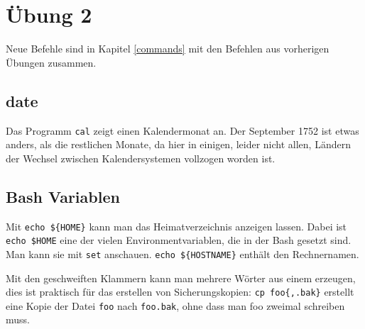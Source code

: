 \documentclass[12pt]{article}
\begin{document}
\section{Übung 2}

Neue Befehle sind in Kapitel \ref{commands} mit den Befehlen aus vorherigen Übungen zusammen.

\subsection{date}

Das Programm \texttt{cal} zeigt einen Kalendermonat an. Der September 1752 ist etwas anders, als die restlichen Monate, da hier in einigen, leider nicht allen, Ländern der Wechsel zwischen Kalendersystemen vollzogen worden ist.

\subsection{Bash Variablen}

Mit \verb#echo ${HOME}# kann man das Heimatverzeichnis anzeigen lassen. Dabei ist \verb#echo $HOME# eine der vielen Environmentvariablen, die in der Bash gesetzt sind. Man kann sie mit \texttt{set} anschauen. \verb#echo ${HOSTNAME}# enthält den Rechnernamen.

Mit den geschweiften Klammern kann man mehrere Wörter aus einem erzeugen, dies ist praktisch für das erstellen von Sicherungskopien: \verb#cp foo{,.bak}# erstellt eine Kopie der Datei \texttt{foo} nach \texttt{foo.bak}, ohne dass man foo zweimal schreiben muss.
\end{document}
